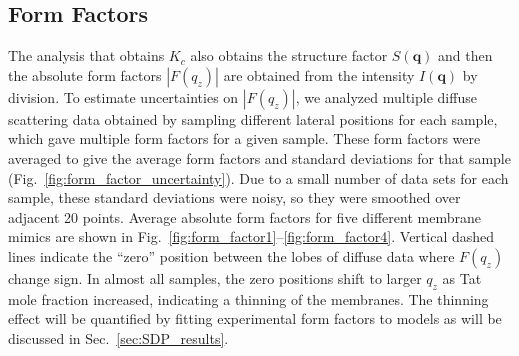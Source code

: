\subsection{Form Factors}\label{sec:form_factors_results}
The analysis that obtains $K_c$ also obtains the structure factor $S(\mathbf{q})$ 
and then the absolute form factors $|F(q_z)|$ are obtained from the intensity 
$I(\mathbf{q})$ by division. 
To estimate uncertainties on $|F(q_z)|$, we analyzed multiple diffuse 
scattering data obtained by sampling different lateral positions for each sample,
which gave multiple form factors for a given sample.
These form factors were averaged to give the average form factors
and standard deviations for that sample (Fig.~\ref{fig:form_factor_uncertainty}).
Due to a small number of data sets for each sample, these standard
deviations were noisy, so they were smoothed over adjacent 20 points.
Average absolute form factors for five different membrane mimics are shown in 
Fig.~\ref{fig:form_factor1}--\ref{fig:form_factor4}. 
Vertical dashed lines indicate the ``zero'' position between the lobes of diffuse data 
where $F(q_z)$ change sign. In almost all samples, the zero positions shift to larger
$q_z$ as Tat mole fraction increased, indicating a thinning of the membranes. The thinning effect will be
quantified by fitting experimental form factors to models as will be discussed in
Sec.~\ref{sec:SDP_results}.

